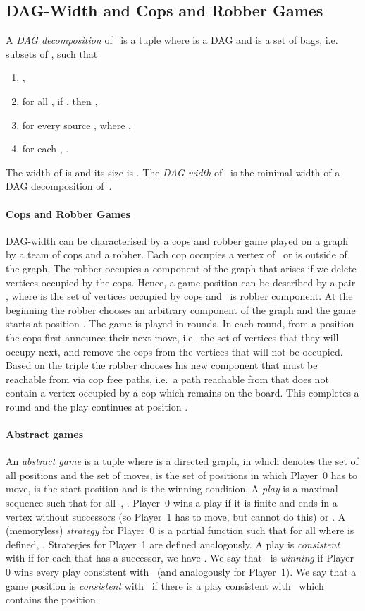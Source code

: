 \documentclass[authoryear]{article}
\makeatletter
\theoremstyle{definition}
\newcommand{\0}{\emptyset}
\newcommand{\Dagw}{DAG-{}width\xspace}
\newcommand{\ie}{i.e.\@\xspace}
\makeatother
\begin{document}
\subsection{DAG-Width and Cops and Robber Games}
A \emph{DAG decomposition} of~ is a tuple  where  is a
DAG and  is a set of bags, \ie subsets of , such that
\begin{enumerate}
\item ,

\item for all , if , then ,

\item for every source , 
  where ,

\item for each , .
\end{enumerate}
The width of  is  and its size is . The 
\emph{DAG-width}  of~ is the
minimal width of a DAG decomposition of~.

\paragraph{Cops and Robber Games} \Dagw can be characterised by a cops and
robber game played on a graph~ by a team of cops and a robber. Each cop
occupies a vertex of~ or is outside of the graph. The robber occupies a
component of the graph that arises if we delete vertices occupied by the
cops. Hence, a game position can be described by a pair , where  is
the set of vertices occupied by cops and~ is robber component. At the
beginning the robber chooses an arbitrary component  of the graph and the
game starts at position . The game is played in rounds. In each
round, from a position  the cops first announce their next move, \ie~the
set  of vertices that they will occupy next, and remove the
cops from the vertices  that will not be occupied. Based on the
triple  the robber chooses his new component  that must be
reachable from  via cop free paths, \ie~a path reachable from  that does
not contain a vertex occupied by a cop which remains on the board.  This
completes a round and the play continues at position .

\paragraph{Abstract games}An \emph{abstract game} is a tuple  where  is a
directed graph, in which  denotes the set of all positions and 
the set of moves,  is the set of positions in which
Player~0 has to move,  is the start position and  is the winning condition. A \emph{play} is a maximal sequence  such that for all~, . Player~0 wins a play  if it is finite and ends in a vertex
 without successors (so Player~1 has
to move, but cannot do this) or . A (memoryless)
\emph{strategy} for Player~0 is a partial function  such
that for all  where  is defined, . Strategies for Player~1 are defined analogously. A play  is \emph{consistent} with  if for each  that
has a successor, we have . We say that~
is \emph{winning} if Player 0 wins every play consistent with~
(and analogously for Player~1). We say that a game position
is \emph{consistent} with~ if there is a play consistent
with~ which contains the position.
\end{document}
